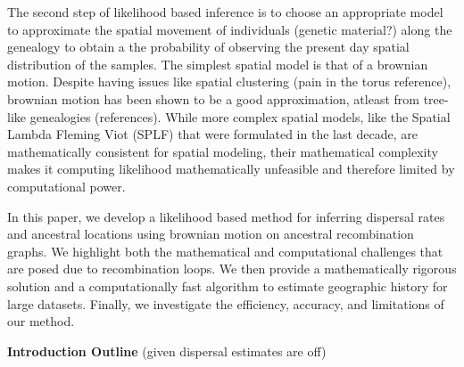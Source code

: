 The second step of likelihood based inference is to choose an appropriate model to approximate the spatial movement of individuals (genetic material?) along the genealogy to obtain a the probability of observing the present day spatial distribution of the samples. The simplest spatial model is that of a brownian motion. Despite having issues like spatial clustering (pain in the torus reference), brownian motion has been shown to be a good approximation, atleast from tree-like genealogies (references). While more complex spatial models, like the Spatial Lambda Fleming Viot (SPLF) that were formulated in the last decade, are mathematically consistent for spatial modeling, their mathematical complexity makes it computing likelihood mathematically unfeasible and therefore limited by computational power. 

In this paper, we develop a likelihood based method for inferring dispersal rates and ancestral locations using brownian motion on ancestral recombination graphs. We highlight both the mathematical and computational challenges that are posed due to recombination loops. We then provide a mathematically rigorous solution and a computationally fast algorithm to estimate geographic history for large datasets. Finally, we investigate the efficiency, accuracy, and limitations of our method. 


\textbf{Introduction Outline} (given dispersal estimates are off) 

